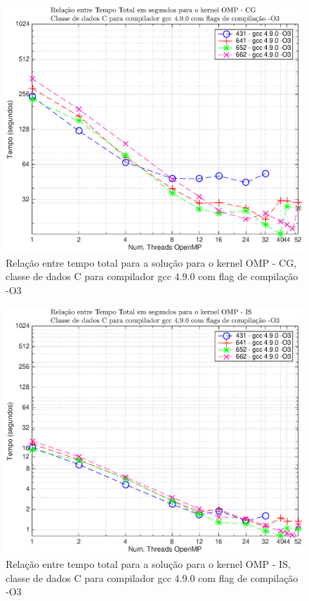\documentclass[conference,compsoc]{IEEEtran}
\begin{document}
\begin{figure}[H]
\centering
\includegraphics[width=1.1\columnwidth]{EPS/OMP/TEMPO_omp_cg_o3.eps}
\caption{Relação entre tempo total para a solução para o kernel OMP - CG, classe de dados C para  compilador gcc 4.9.0 com flag de compilação -O3}
\label{tempo_omp_cg_c}
\end{figure}

\begin{figure}[H]
\centering
\includegraphics[width=1.1\columnwidth]{EPS/OMP/TEMPO_omp_is_o3.eps}
\caption{Relação entre tempo total para a solução para o kernel OMP - IS, classe de dados C para  compilador gcc 4.9.0 com flag de compilação -O3}
\label{tempo_omp_is_c}
\end{figure}
\end{document}
